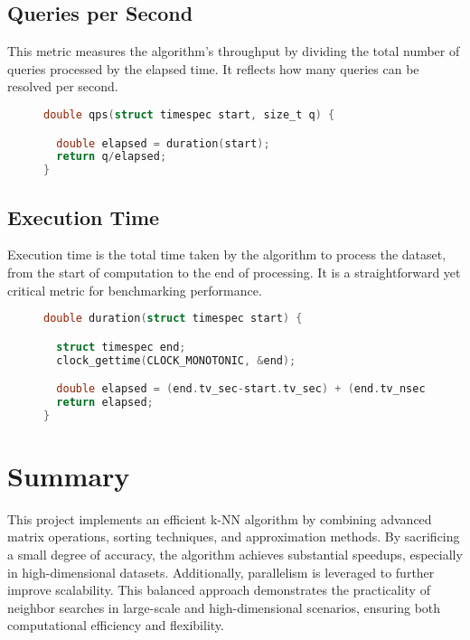 \documentclass{article}
\begin{document}
\phantom{This is a placeholder}

\subsection{Queries per Second}
This metric measures the algorithm's throughput by dividing the total number of queries processed by the elapsed time. It reflects how many queries can be resolved per second.

\begin{figure}[H]
\begin{lstlisting}[language=C, caption={Routine for Calculating Queries per Second}]
double qps(struct timespec start, size_t q) {

  double elapsed = duration(start);
  return q/elapsed;
}
\end{lstlisting}
\end{figure}

\subsection{Execution Time}
Execution time is the total time taken by the algorithm to process the dataset, from the start of computation to the end of processing. It is a straightforward yet critical metric for benchmarking performance.

\begin{figure}[H]
\begin{lstlisting}[language=C, caption={Routine for Calculating Elapsed Time}]
double duration(struct timespec start) {

  struct timespec end;
  clock_gettime(CLOCK_MONOTONIC, &end);

  double elapsed = (end.tv_sec-start.tv_sec) + (end.tv_nsec-start.tv_nsec)/1e9;
  return elapsed;
}
\end{lstlisting}
\end{figure}

\section{Summary}
This project implements an efficient k-NN algorithm by combining advanced matrix operations, sorting techniques, and approximation methods. By sacrificing a small degree of accuracy, the algorithm achieves substantial speedups, especially in high-dimensional datasets. Additionally, parallelism is leveraged to further improve scalability. This balanced approach demonstrates the practicality of neighbor searches in large-scale and high-dimensional scenarios, ensuring both computational efficiency and flexibility.
\end{document}
